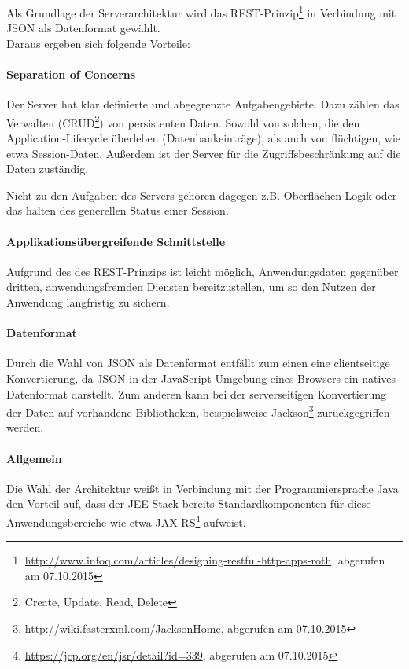 \documentclass[12pt, xcolor=dvipsnames]{scrartcl}
\begin{document}
Als Grundlage der Serverarchitektur wird das
REST-Prinzip\footnote{\url{http://www.infoq.com/articles/designing-restful-http-apps-roth}, abgerufen am 07.10.2015} 
in Verbindung mit JSON als Datenformat gewählt. \\

Daraus ergeben sich folgende Vorteile:

\paragraph{Separation of Concerns}
Der Server hat klar definierte und abgegrenzte Aufgabengebiete. Dazu zählen das Verwalten
(CRUD\footnote{Create, Update, Read, Delete}) von persistenten Daten. Sowohl von solchen, die den Application-Lifecycle überleben (Datenbankeinträge), als auch von flüchtigen, wie etwa Session-Daten. Außerdem ist der Server für die Zugriffsbeschränkung auf die Daten zuständig.

Nicht zu den Aufgaben des Servers gehören dagegen z.B. Oberflächen-Logik oder das halten des generellen Status einer Session.

\paragraph{Applikationsübergreifende Schnittstelle}
Aufgrund des des REST-Prinzips ist leicht möglich, Anwendungsdaten gegenüber dritten, anwendungsfremden Diensten bereitzustellen, um so den Nutzen der Anwendung langfristig zu sichern.

\paragraph{Datenformat}
Durch die Wahl von JSON als Datenformat entfällt zum einen eine clientseitige Konvertierung, da JSON in der JavaScript-Umgebung eines Browsers ein natives Datenformat darstellt. Zum anderen kann bei der serverseitigen Konvertierung der Daten auf vorhandene Bibliotheken, beispielsweise
Jackson\footnote{\url{http://wiki.fasterxml.com/JacksonHome}, abgerufen am 07.10.2015}
zurückgegriffen werden.

\paragraph{Allgemein}
Die Wahl der Architektur weißt in Verbindung mit der Programmiersprache Java den Vorteil auf, dass der JEE-Stack bereits Standardkomponenten für diese Anwendungsbereiche wie etwa
JAX-RS\footnote{\url{https://jcp.org/en/jsr/detail?id=339}, abgerufen am 07.10.2015}
aufweist.
\end{document}
